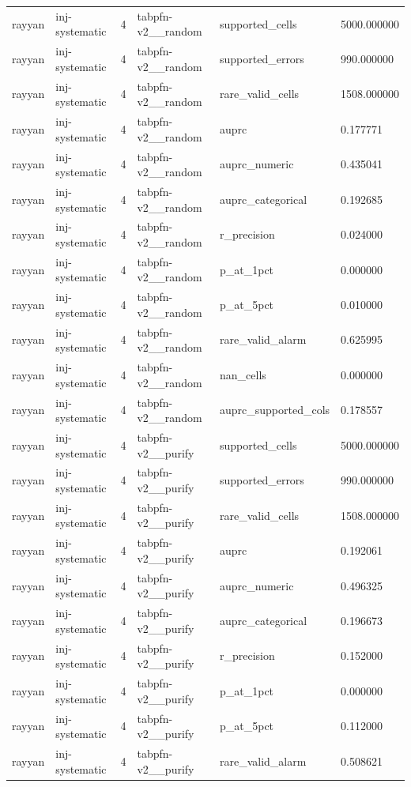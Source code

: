 \begin{tabular}{llllll}
rayyan & inj-systematic & 4 & tabpfn-v2\_\_random & supported\_cells & 5000.000000 \\
rayyan & inj-systematic & 4 & tabpfn-v2\_\_random & supported\_errors & 990.000000 \\
rayyan & inj-systematic & 4 & tabpfn-v2\_\_random & rare\_valid\_cells & 1508.000000 \\
rayyan & inj-systematic & 4 & tabpfn-v2\_\_random & auprc & 0.177771 \\
rayyan & inj-systematic & 4 & tabpfn-v2\_\_random & auprc\_numeric & 0.435041 \\
rayyan & inj-systematic & 4 & tabpfn-v2\_\_random & auprc\_categorical & 0.192685 \\
rayyan & inj-systematic & 4 & tabpfn-v2\_\_random & r\_precision & 0.024000 \\
rayyan & inj-systematic & 4 & tabpfn-v2\_\_random & p\_at\_1pct & 0.000000 \\
rayyan & inj-systematic & 4 & tabpfn-v2\_\_random & p\_at\_5pct & 0.010000 \\
rayyan & inj-systematic & 4 & tabpfn-v2\_\_random & rare\_valid\_alarm & 0.625995 \\
rayyan & inj-systematic & 4 & tabpfn-v2\_\_random & nan\_cells & 0.000000 \\
rayyan & inj-systematic & 4 & tabpfn-v2\_\_random & auprc\_supported\_cols & 0.178557 \\
rayyan & inj-systematic & 4 & tabpfn-v2\_\_purify & supported\_cells & 5000.000000 \\
rayyan & inj-systematic & 4 & tabpfn-v2\_\_purify & supported\_errors & 990.000000 \\
rayyan & inj-systematic & 4 & tabpfn-v2\_\_purify & rare\_valid\_cells & 1508.000000 \\
rayyan & inj-systematic & 4 & tabpfn-v2\_\_purify & auprc & 0.192061 \\
rayyan & inj-systematic & 4 & tabpfn-v2\_\_purify & auprc\_numeric & 0.496325 \\
rayyan & inj-systematic & 4 & tabpfn-v2\_\_purify & auprc\_categorical & 0.196673 \\
rayyan & inj-systematic & 4 & tabpfn-v2\_\_purify & r\_precision & 0.152000 \\
rayyan & inj-systematic & 4 & tabpfn-v2\_\_purify & p\_at\_1pct & 0.000000 \\
rayyan & inj-systematic & 4 & tabpfn-v2\_\_purify & p\_at\_5pct & 0.112000 \\
rayyan & inj-systematic & 4 & tabpfn-v2\_\_purify & rare\_valid\_alarm & 0.508621 \\

\end{tabular}
